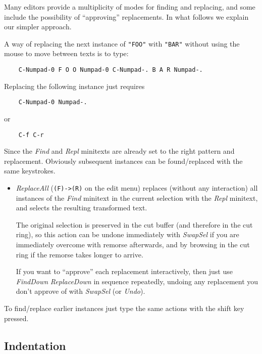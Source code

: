 \documentclass[
]{article}
\begin{document}
Many editors provide a multiplicity of modes for finding and replacing,
and some include the possibility of ``approving'' replacements. In what
follows we explain our simpler approach.

A way of replacing the next instance of \texttt{"FOO"} with
\texttt{"BAR"} without using the mouse to move between texts is to type:

\begin{verbatim}
    C-Numpad-0 F O O Numpad-0 C-Numpad-. B A R Numpad-.
\end{verbatim}

Replacing the following instance just requires

\begin{verbatim}
    C-Numpad-0 Numpad-.
\end{verbatim}

or

\begin{verbatim}
    C-f C-r
\end{verbatim}

Since the \emph{Find} and \emph{Repl} minitexts are already set to the
right pattern and replacement. Obviously subsequent instances can be
found/replaced with the same keystrokes.

\begin{itemize}
\item
  \emph{ReplaceAll} (\texttt{(F)-\textgreater{}(R)} on the edit menu)
  replaces (without any interaction) all instances of the \emph{Find}
  minitext in the current selection with the \emph{Repl} minitext, and
  selects the resulting transformed text.

  The original selection is preserved in the cut buffer (and therefore
  in the cut ring), so this action can be undone immediately with
  \emph{SwapSel} if you are immediately overcome with remorse
  afterwards, and by browsing in the cut ring if the remorse takes
  longer to arrive.

  If you want to ``approve'' each replacement interactively, then just
  use \emph{FindDown} \emph{ReplaceDown} in sequence repeatedly, undoing
  any replacement you don't approve of with \emph{SwapSel} (or
  \emph{Undo}).
\end{itemize}

To find/replace earlier instances just type the same actions with the
shift key pressed.

\hypertarget{indentation}{%
\subsection{Indentation}\label{indentation}}
\end{document}

